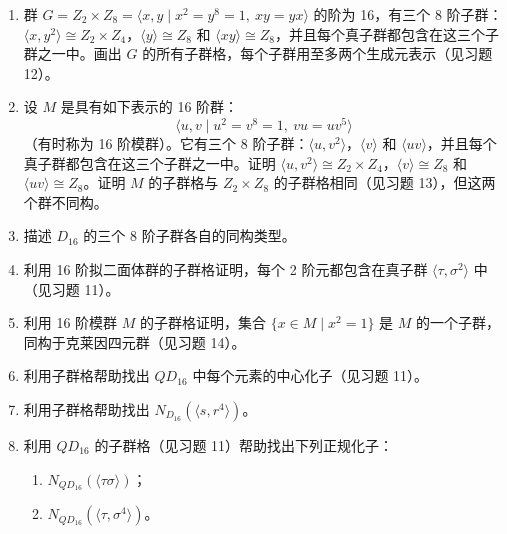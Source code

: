 \begin{enumerate}[label=\arabic*]
\begin{center}
\end{center}


\item 群 \(G = Z_2 \times Z_8 = \langle x, y \mid x^2 = y^8 = 1,\ xy = yx \rangle\) 的阶为 16，有三个 8 阶子群：\(\langle x, y^2 \rangle \cong Z_2 \times Z_4\)，\(\langle y \rangle \cong Z_8\) 和 \(\langle xy \rangle \cong Z_8\)，并且每个真子群都包含在这三个子群之一中。画出 \(G\) 的所有子群格，每个子群用至多两个生成元表示（见习题 12）。

\item 设 \(M\) 是具有如下表示的 16 阶群：
\[
\langle u, v \mid u^2 = v^8 = 1,\ vu = uv^5 \rangle
\]
（有时称为 16 阶模群）。它有三个 8 阶子群：\(\langle u, v^2 \rangle\)，\(\langle v \rangle\) 和 \(\langle uv \rangle\)，并且每个真子群都包含在这三个子群之一中。证明 \(\langle u, v^2 \rangle \cong Z_2 \times Z_4\)，\(\langle v \rangle \cong Z_8\) 和 \(\langle uv \rangle \cong Z_8\)。证明 \(M\) 的子群格与 \(Z_2 \times Z_8\) 的子群格相同（见习题 13），但这两个群不同构。

\item 描述 \(D_{16}\) 的三个 8 阶子群各自的同构类型。

\item 利用 16 阶拟二面体群的子群格证明，每个 2 阶元都包含在真子群 \(\langle \tau, \sigma^2 \rangle\) 中（见习题 11）。

\item 利用 16 阶模群 \(M\) 的子群格证明，集合 \(\{x \in M \mid x^2 = 1\}\) 是 \(M\) 的一个子群，同构于克莱因四元群（见习题 14）。

\item 利用子群格帮助找出 \(QD_{16}\) 中每个元素的中心化子（见习题 11）。

\item 利用子群格帮助找出 \(N_{D_{16}}(\langle s, r^4 \rangle)\)。

\item 利用 \(QD_{16}\) 的子群格（见习题 11）帮助找出下列正规化子：
\begin{enumerate}[label=(\alph*)]
\item \(N_{QD_{16}}(\langle \tau \sigma \rangle)\)；
\item \(N_{QD_{16}}(\langle \tau, \sigma^4 \rangle)\)。
\end{enumerate}
\end{enumerate}
